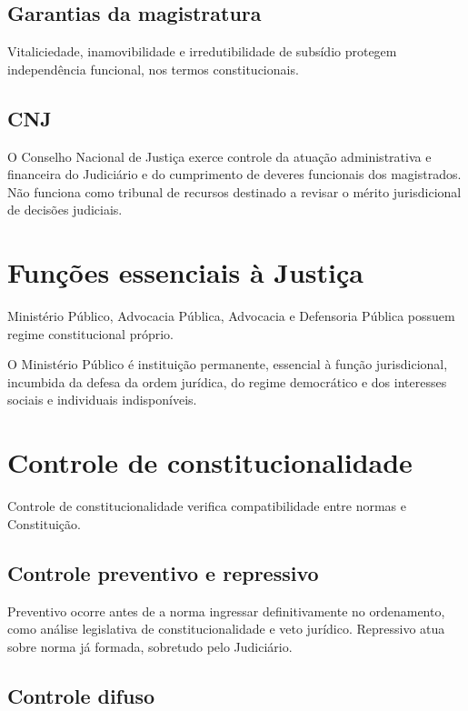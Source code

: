 \subsection{Garantias da magistratura}

Vitaliciedade, inamovibilidade e irredutibilidade de subsídio protegem independência funcional, nos termos constitucionais.

\subsection{CNJ}

O Conselho Nacional de Justiça exerce controle da atuação administrativa e financeira do Judiciário e do cumprimento de deveres funcionais dos magistrados. Não funciona como tribunal de recursos destinado a revisar o mérito jurisdicional de decisões judiciais.

\section{Funções essenciais à Justiça}

Ministério Público, Advocacia Pública, Advocacia e Defensoria Pública possuem regime constitucional próprio.

O Ministério Público é instituição permanente, essencial à função jurisdicional, incumbida da defesa da ordem jurídica, do regime democrático e dos interesses sociais e individuais indisponíveis.

\section{Controle de constitucionalidade}

Controle de constitucionalidade verifica compatibilidade entre normas e Constituição.

\subsection{Controle preventivo e repressivo}

Preventivo ocorre antes de a norma ingressar definitivamente no ordenamento, como análise legislativa de constitucionalidade e veto jurídico. Repressivo atua sobre norma já formada, sobretudo pelo Judiciário.

\subsection{Controle difuso}

